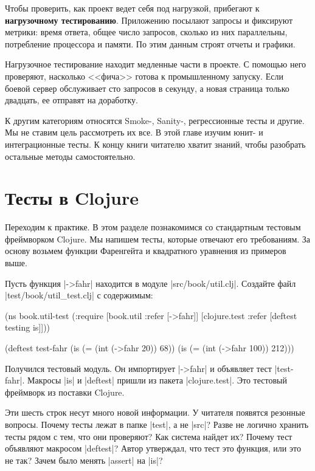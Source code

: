 Чтобы проверить, как проект ведет себя под нагрузкой, прибегают к
\textbf{нагрузочному тестированию}. Приложению посылают запросы и фиксируют
метрики: время ответа, общее число запросов, сколько из них параллельны,
потребление процессора и памяти. По этим данным строят отчеты и графики.

Нагрузочное тестирование находит медленные части в проекте. С помощью него
проверяют, насколько <<фича>> готова к промышленному запуску. Если боевой сервер
обслуживает сто запросов в секунду, а новая страница только двадцать, ее
отправят на доработку.

К другим категориям относятся Smoke-, Sanity-, регрессионные тесты и другие. Мы
не ставим цель рассмотреть их все. В этой главе изучим юнит- и интеграционные
тесты. К концу книги читателю хватит знаний, чтобы разобрать остальные методы
самостоятельно.

\section{Тесты в Clojure}

Переходим к практике. В этом разделе познакомимся со стандартным тестовым
фреймворком Clojure. Мы напишем тесты, которые отвечают его требованиям. За
основу возьмем функции Фаренгейта и квадратного уравнения из примеров выше.

Пусть функция \spverb|->fahr| находится в модуле
\spverb|src/book/util.clj|. Создайте файл \spverb|test/book/util_test.clj| с
содержимым:

\begin{english}
  \begin{clojure}
(ns book.util-test
  (:require [book.util :refer [->fahr]]
            [clojure.test :refer [deftest testing is]]))

(deftest test-fahr
  (is (= (int (->fahr 20)) 68))
  (is (= (int (->fahr 100)) 212)))
  \end{clojure}
\end{english}

Получился тестовый модуль. Он импортирует \spverb|->fahr| и объявляет тест
\spverb|test-fahr|. Макросы \spverb|is| и \spverb|deftest| пришли из пакета
\spverb|clojure.test|. Это тестовый фреймворк из поставки Clojure.

Эти шесть строк несут много новой информации. У читателя появятся резонные
вопросы. Почему тесты лежат в папке \spverb|test|, а не \spverb|src|? Разве не
логично хранить тесты рядом с тем, что они проверяют? Как система найдет их?
Почему тест объявляют макросом \spverb|deftest|? Автор утверждал, что тест это
функция, или это не так? Зачем было менять \spverb|assert| на \spverb|is|?

